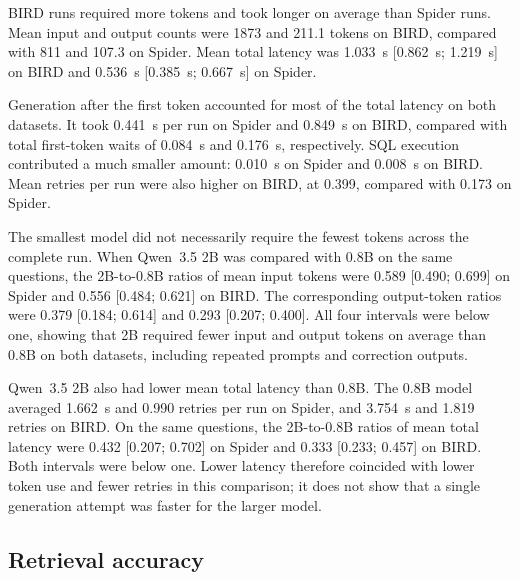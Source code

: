 

BIRD runs required more tokens and took longer on average than Spider runs. Mean input and output counts were
\num{1873} and \num{211.1} tokens on BIRD, compared with \num{811} and \num{107.3} on Spider. Mean total
latency was \qty{1.033}{\second} [\qty{0.862}{\second}; \qty{1.219}{\second}] on BIRD and \qty{0.536}{\second}
[\qty{0.385}{\second}; \qty{0.667}{\second}] on Spider.

Generation after the first token accounted for most of the total latency on both datasets. It took
\qty{0.441}{\second} per run on Spider and \qty{0.849}{\second} on BIRD, compared with total first-token
waits of \qty{0.084}{\second} and \qty{0.176}{\second}, respectively. SQL execution contributed a much
smaller amount: \qty{0.010}{\second} on Spider and \qty{0.008}{\second} on BIRD. Mean retries per run were
also higher on BIRD, at \num{0.399}, compared with \num{0.173} on Spider.

The smallest model did not necessarily require the fewest tokens across the complete run. When Qwen~3.5 2B
was compared with \num{0.8}B on the same questions, the 2B-to-\num{0.8}B ratios of mean input tokens were
\num{0.589} [\num{0.490}; \num{0.699}] on Spider and \num{0.556} [\num{0.484}; \num{0.621}] on BIRD. The
corresponding output-token ratios were \num{0.379} [\num{0.184}; \num{0.614}] and \num{0.293}
[\num{0.207}; \num{0.400}]. All four intervals were below one, showing that 2B required fewer input and output
tokens on average than \num{0.8}B on both datasets, including repeated prompts and correction outputs.

Qwen~3.5 2B also had lower mean total latency than \num{0.8}B. The \num{0.8}B model averaged
\qty{1.662}{\second} and \num{0.990} retries per run on Spider, and \qty{3.754}{\second} and \num{1.819}
retries on BIRD. On the same questions, the 2B-to-\num{0.8}B ratios of mean total latency were \num{0.432}
[\num{0.207}; \num{0.702}] on Spider and \num{0.333} [\num{0.233}; \num{0.457}] on BIRD. Both intervals were
below one. Lower latency therefore coincided with lower token use and fewer retries in this comparison; it
does not show that a single generation attempt was faster for the larger model.

\subsection{Retrieval accuracy}

